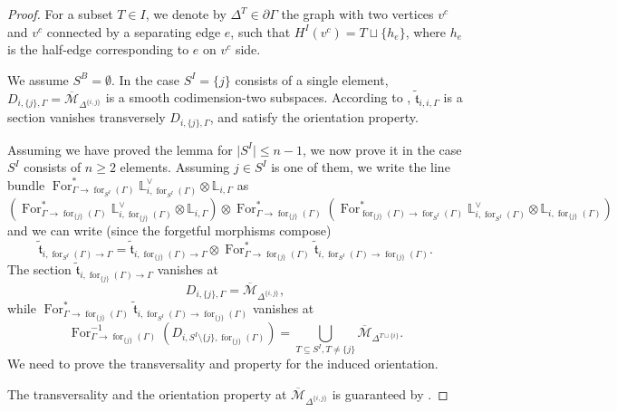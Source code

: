 \documentclass[11pt]{amsart}
\theoremstyle{definition}
\theoremstyle{remark}
\renewcommand{\for}{\operatorname{for}}
\newcommand{\For}{\operatorname{For}}
\newcommand{\<}{\left<}
\renewcommand{\>}{\right>}
\numberwithin{equation}{section}
\def\Mbar{{\overline{\mathcal M}}}
\begin{document}
\begin{proof}
 For a subset $T\in I$, we denote by $\Delta^{T}\in \partial {\Gamma}$ the graph with two vertices $v^c$ and $v^c$ connected by a separating edge $e$, such that $H^I(v^c)=T\sqcup \{h_e\}$, where $h_e$ is the half-edge corresponding to $e$ on $v^c$ side.

We assume $S^B=\emptyset$. In the case $S^I=\{j\}$ consists of a single element, $D_{i,\{j\},\Gamma}=\Mbar_{\Delta^{\{i,j\}}}$ is a smooth codimension-two subspaces. According to \cite[Lemma 3.43]{PST14}, $\tilde{\mathfrak t}_{i,{i},\Gamma}$ is a section vanishes transversely $D_{i,\{j\},\Gamma}$, and satisfy the orientation property.

Assuming we have proved the lemma for $\lvert S^I\rvert\le n-1$, we now prove it in the case $S^I$ consists of $n\ge 2$ elements. Assuming $j\in S^I$ is one of them, we write the line bundle $\For_{\Gamma\to \for_{{S^I}}(\Gamma)}^* \mathbb L_{i,\for_{S^I}(\Gamma)}^\vee \otimes \mathbb L_{i,\Gamma}$ as
$$(\For_{\Gamma\to \for_{\{j\}}(\Gamma)}^* \mathbb L_{i,\for_{\{j\}}(\Gamma)}^\vee \otimes \mathbb L_{i,\Gamma})\otimes \For_{\Gamma\to \for_{\{j\}}(\Gamma)}^*(\For_{\for_{\{j\}}(\Gamma)\to \for_{S^I}(\Gamma)}^* \mathbb L_{i,\for_{S^I}(\Gamma)}^\vee \otimes \mathbb L_{i,\for_{\{j\}}(\Gamma)})$$
and we can write (since the forgetful morphisms compose)
$$\tilde{\mathfrak t}_{i,\for_{S^I}(\Gamma)\to\Gamma}= \tilde{\mathfrak t}_{i,\for_{\{j\}}(\Gamma)\to\Gamma}\otimes  \For_{\Gamma\to \for_{\{j\}}(\Gamma)}^* \tilde{\mathfrak t}_{i,\for_{S^I}(\Gamma)\to \for_{\{j\}}(\Gamma)}.$$
The section $\tilde{\mathfrak t}_{i,\for_{\{j\}}(\Gamma)\to\Gamma}$ vanishes at $$D_{i,\{j\},\Gamma}=\Mbar_{\Delta^{\{i,j\}}},$$ 
while $\For_{\Gamma\to \for_{\{j\}}(\Gamma)}^* \tilde{\mathfrak t}_{i,\for_{S^I}(\Gamma)\to \for_{\{j\}}(\Gamma)}$ vanishes at $$\For_{\Gamma \to \for_{\{j\}}(\Gamma)}^{-1}(D_{i,S^I\setminus\{j\},\for_{\{j\}}(\Gamma)})=\bigcup_{T\subseteq S^I, T\ne \{j\}}\Mbar_{\Delta^{T\sqcup\{i\}}}.$$
We need to prove the transversality and property for the induced orientation.  

The transversality and the orientation property at $\Mbar_{\Delta^{\{i,j\}}}$ is guaranteed by \cite[Lemma 3.43]{PST14}.


\end{proof}
\end{document}
